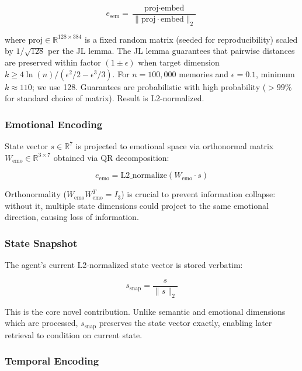 \documentclass[10pt,twocolumn,letterpaper]{article}
\begin{document}
\begin{equation}
e_{\text{sem}} = \frac{\text{proj} \cdot \text{embed}}{\|\text{proj} \cdot \text{embed}\|_2}
\end{equation}

where $\text{proj} \in \mathbb{R}^{128 \times 384}$ is a fixed random matrix (seeded for reproducibility) scaled by $1/\sqrt{128}$ per the JL lemma. The JL lemma guarantees that pairwise distances are preserved within factor $(1 \pm \epsilon)$ when target dimension $k \geq 4 \ln(n) / (\epsilon^2 / 2 - \epsilon^3 / 3)$. For $n = 100,000$ memories and $\epsilon = 0.1$, minimum $k \approx 110$; we use 128. Guarantees are probabilistic with high probability ($> 99\%$ for standard choice of matrix). Result is L2-normalized.

\subsubsection{Emotional Encoding}

State vector $s \in \mathbb{R}^{7}$ is projected to emotional space via orthonormal matrix $W_{\text{emo}} \in \mathbb{R}^{3 \times 7}$ obtained via QR decomposition:

\begin{equation}
e_{\text{emo}} = \text{L2\_normalize}(W_{\text{emo}} \cdot s)
\end{equation}

Orthonormality ($W_{\text{emo}} W_{\text{emo}}^T = I_3$) is crucial to prevent information collapse: without it, multiple state dimensions could project to the same emotional direction, causing loss of information.

\subsubsection{State Snapshot}

The agent's current L2-normalized state vector is stored verbatim:

\begin{equation}
s_{\text{snap}} = \frac{s}{\|s\|_2}
\end{equation}

This is the core novel contribution. Unlike semantic and emotional dimensions which are processed, $s_{\text{snap}}$ preserves the state vector exactly, enabling later retrieval to condition on current state.

\subsubsection{Temporal Encoding}
\end{document}
